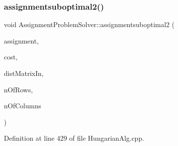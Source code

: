 \subsubsection{\texorpdfstring{assignmentsuboptimal2()}{assignmentsuboptimal2()}}
{\footnotesize\ttfamily void Assignment\+Problem\+Solver\+::assignmentsuboptimal2 (\begin{DoxyParamCaption}\item[{\mbox{\hyperlink{_hungarian_alg_8h_ad7b9f569a9adbd958c668a36b6884ffd}{assignments\+\_\+t}} \&}]{assignment,  }\item[{\mbox{\hyperlink{defines_8h_a7ce9c8817b42ab418e61756f579549ab}{track\+\_\+t}} \&}]{cost,  }\item[{const \mbox{\hyperlink{_hungarian_alg_8h_af6ab0ee8259a51215f62e8f96416d5bb}{dist\+Matrix\+\_\+t}} \&}]{dist\+Matrix\+In,  }\item[{size\+\_\+t}]{n\+Of\+Rows,  }\item[{size\+\_\+t}]{n\+Of\+Columns }\end{DoxyParamCaption})\hspace{0.3cm}{\ttfamily [private]}}



Definition at line 429 of file Hungarian\+Alg.\+cpp.


